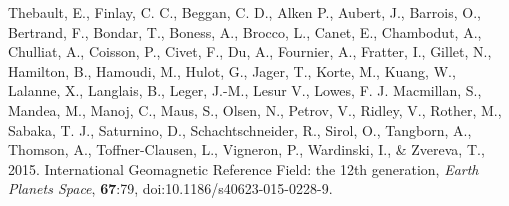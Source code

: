 \begin{thebibliography}{}
%
Thebault, E., Finlay, C. C., Beggan, C. D., Alken P., Aubert, J., Barrois, O., Bertrand, F., Bondar, T., Boness, A., Brocco, L., Canet, E., Chambodut, A., Chulliat, A., Coisson, P., Civet, F., Du, A., Fournier, A., Fratter, I., Gillet, N., Hamilton, B., Hamoudi, M., Hulot, G., Jager, T., Korte, M., Kuang, W., Lalanne, X., Langlais, B., Leger, J.-M., Lesur V., Lowes, F. J. Macmillan, S., Mandea, M., Manoj, C., Maus, S., Olsen, N., Petrov, V., Ridley, V., Rother, M., Sabaka, T. J., Saturnino, D., Schachtschneider, R., Sirol, O., Tangborn, A., Thomson, A., Toffner-Clausen, L., Vigneron, P., Wardinski, I., \& Zvereva, T., 2015. International Geomagnetic Reference Field: the 12th generation, {\it Earth Planets Space}, {\bf 67}:79, doi:10.1186/s40623-015-0228-9.
%

\end{thebibliography}
